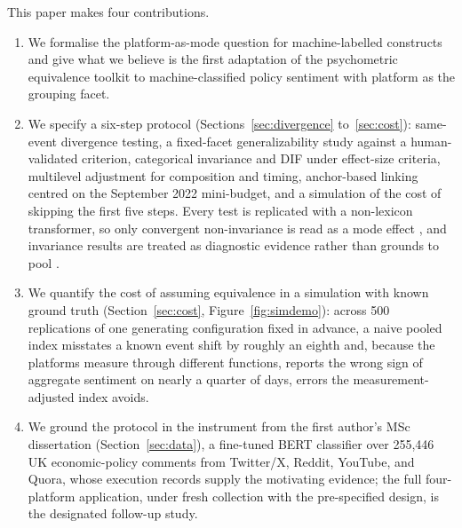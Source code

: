 This paper makes four contributions.
\begin{enumerate}
  \item We formalise the platform-as-mode question for machine-labelled
    constructs and give what we believe is the first adaptation of the
    psychometric equivalence toolkit to machine-classified policy
    sentiment with platform as the grouping facet.
  \item We specify a six-step protocol (Sections~\ref{sec:divergence} to~\ref{sec:cost}): same-event divergence testing, a fixed-facet generalizability study against a human-validated criterion, categorical invariance and DIF under effect-size criteria, multilevel adjustment for composition and timing, anchor-based linking centred on the September 2022 mini-budget, and a simulation of the cost of skipping the first five steps. Every test is replicated with a non-lexicon transformer, so only convergent non-invariance is read as a mode effect \citep{czarnek2022}, and invariance results are treated as diagnostic evidence rather than grounds to pool \citep{robitzsch2023}.
  \item We quantify the cost of assuming equivalence in a simulation with known ground truth (Section~\ref{sec:cost}, Figure~\ref{fig:simdemo}): across 500 replications of one generating configuration fixed in advance, a naive pooled index misstates a known event shift by roughly an eighth and, because the platforms measure through different functions, reports the wrong sign of aggregate sentiment on nearly a quarter of days, errors the measurement-adjusted index avoids.
  \item We ground the protocol in the instrument from the first author's MSc dissertation (Section~\ref{sec:data}), a fine-tuned BERT classifier over 255,446 UK economic-policy comments from Twitter/X, Reddit, YouTube, and Quora, whose execution records supply the motivating evidence; the full four-platform application, under fresh collection with the pre-specified design, is the designated follow-up study.
\end{enumerate}


